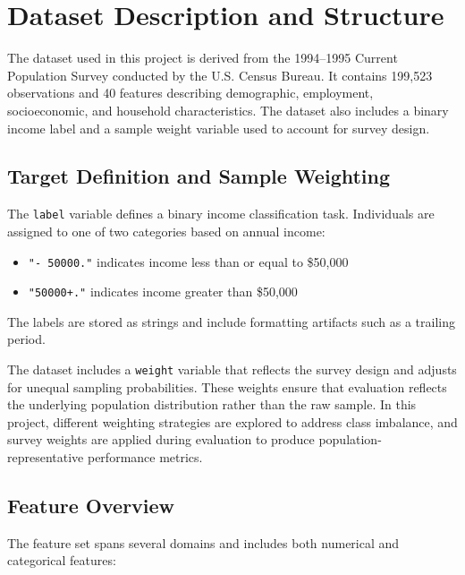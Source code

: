 
\section{Dataset Description and Structure}

The dataset used in this project is derived from the 1994--1995 Current Population Survey conducted by the U.S. Census Bureau. It contains 199,523 observations and 40 features describing demographic, employment, socioeconomic, and household characteristics. The dataset also includes a binary income label and a sample weight variable used to account for survey design.

\subsection{Target Definition and Sample Weighting}

The \texttt{label} variable defines a binary income classification task. Individuals are assigned to one of two categories based on annual income:

\begin{itemize}
    \item \texttt{"- 50000."} indicates income less than or equal to \$50,000
    \item \texttt{"50000+."} indicates income greater than \$50,000
\end{itemize}

The labels are stored as strings and include formatting artifacts such as a trailing period.

The dataset includes a \texttt{weight} variable that reflects the survey design and adjusts for unequal sampling probabilities. These weights ensure that evaluation reflects the underlying population distribution rather than the raw sample. In this project, different weighting strategies are explored to address class imbalance, and survey weights are applied during evaluation to produce population-representative performance metrics.

\subsection{Feature Overview}

The feature set spans several domains and includes both numerical and categorical features:

